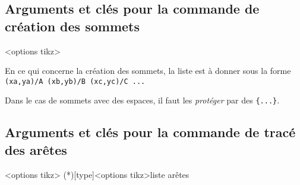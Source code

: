 \documentclass[french,a4paper,11pt]{article}
\begin{document}
\pagebreak

\subsection{Arguments et clés pour la commande de création des sommets}

\begin{DemoCode}
\begin{GrapheTikz}[clés]<options tikz>
\end{GrapheTikz}
\end{DemoCode}

\begin{tipblock}
En ce qui concerne la création des sommets, la liste est à donner sous la forme \verb!(xa,ya)/A (xb,yb)/B (xc,yc)/C ...!

\smallskip

Dans le cas de sommets avec des espaces, il faut les \textit{protéger} par des \texttt{\{...\}}.
\end{tipblock}

\begin{DemoCode}[]
\begin{GrapheTikz}[CouleurSommets={brown/purple},TypeSommets=ellipse,Police={}]
\end{GrapheTikz}
\end{DemoCode}

\begin{DemoCode}[]
\begin{GrapheTikz}[Epaisseur={very thick},Grille={5,4},DimensionSommets=1.5cm]
\end{GrapheTikz}
\end{DemoCode}

\begin{DemoCode}[]
\begin{GrapheTikz}[TypeSommets=diamond,DimensionSommets=2cm/1.5cm]
\end{GrapheTikz}
\end{DemoCode}

\pagebreak

\subsection{Arguments et clés pour la commande de tracé des arêtes}

\begin{DemoCode}
\begin{GrapheTikz}[clés]<options tikz>
	\GrphTraceAretes(*)[type]<options tikz>{liste arêtes}
\end{GrapheTikz}
\end{DemoCode}
\end{document}
